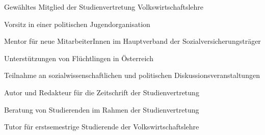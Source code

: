 

	{\begin{cvenumerate}
		\item Gewähltes Mitglied der Studienvertretung Volkswirtschaftslehre
		\item Vorsitz in einer politischen Jugendorganisation
	\end{cvenumerate}}

	{\begin{cvenumerate}
		\item Mentor für neue MitarbeiterInnen im Hauptverband der Sozialversicherungsträger
		\item Unterstützungen von Flüchtlingen in Österreich
		\item Teilnahme an sozialwissenschaftlichen und politischen Diskussionsveranstaltungen
	\end{cvenumerate}}

{\begin{cvenumerate}
		\item Autor und Redakteur für die Zeitschrift der Studienvertretung
		\item Beratung von Studierenden im Rahmen der Studienvertretung
		\item Tutor für erstsemestrige Studierende der Volkswirtschaftslehre
	\end{cvenumerate}}